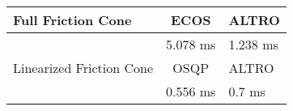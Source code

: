 \begin{tabular}{lcl}
\toprule 
Full Friction Cone & ECOS & ALTRO \\
\midrule 
 & 5.078 ms & 1.238 ms \\
\toprule 
Linearized Friction Cone & OSQP & ALTRO \\
\midrule 
 & 0.556 ms & 0.7 ms \\
\bottomrule 
\end{tabular}
